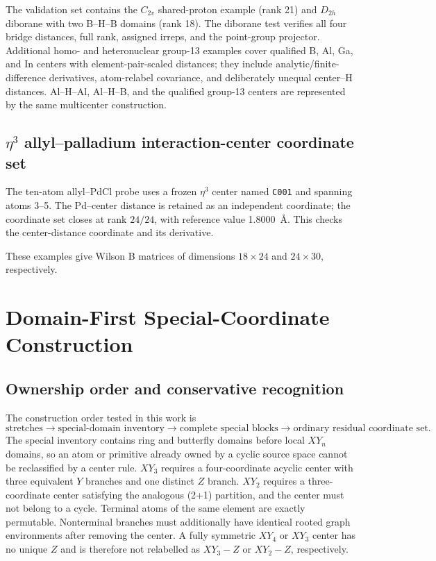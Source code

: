 \documentclass[10pt]{article}
\begin{document}
The validation set contains the \(C_{2v}\) shared-proton example (rank 21) and
\(D_{2h}\) diborane with two B--H--B domains (rank 18).  The diborane test
verifies all four bridge distances, full rank, assigned irreps, and the
point-group projector.  Additional homo- and heteronuclear group-13 examples
cover qualified B, Al, Ga, and In centers with element-pair-scaled distances;
they include analytic/finite-difference derivatives, atom-relabel covariance,
and deliberately unequal center--H distances.  Al--H--Al, Al--H--B, and the qualified group-13 centers are represented
by the same multicenter construction.



\subsection{\texorpdfstring{$\eta^3$}{eta3} allyl--palladium interaction-center coordinate set}

The ten-atom allyl--PdCl probe uses a frozen \(\eta^3\) center named
\texttt{C001} and spanning atoms 3--5.  The Pd--center distance is retained
as an independent coordinate; the coordinate set closes
at rank \(24/24\), with reference value 1.8000~\AA.  This checks the center-distance coordinate and its derivative.



These examples give Wilson B matrices of dimensions
\(18\times24\) and \(24\times30\), respectively.

\section{Domain-First Special-Coordinate Construction}

\subsection{Ownership order and conservative recognition}

The construction order tested in this work is
\[
\text{stretches}\longrightarrow\text{special-domain inventory}
\longrightarrow\text{complete special blocks}
\longrightarrow\text{ordinary residual coordinate set}.
\]
The special inventory contains ring and butterfly domains before local
\(XY_n\) domains, so an atom or primitive already owned by a cyclic source
space cannot be reclassified by a center rule.  \(XY_3\) requires a
four-coordinate acyclic center with three equivalent \(Y\) branches and one
distinct \(Z\) branch.  \(XY_2\) requires a three-coordinate center satisfying
the analogous (2+1) partition, and the center must not belong to a cycle.
Terminal atoms of the same element are exactly permutable.  Nonterminal
branches must additionally have identical rooted graph environments after
removing the center.  A fully symmetric \(XY_4\) or \(XY_3\) center has no
unique \(Z\) and is therefore not relabelled as \(XY_3-Z\) or \(XY_2-Z\),
respectively.
\end{document}
